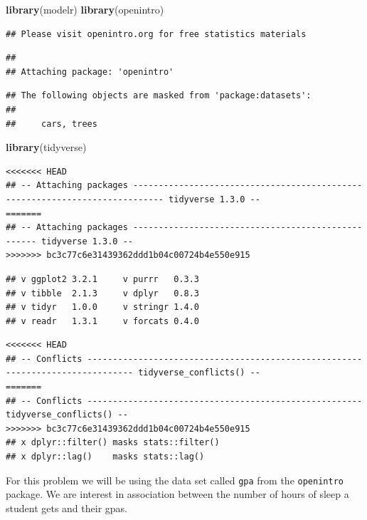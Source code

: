 \documentclass[]{article}
\newenvironment{Shaded}{\begin{snugshade}}{\end{snugshade}}
\newcommand{\KeywordTok}[1]{\textcolor[rgb]{0.13,0.29,0.53}{\textbf{#1}}}
\newcommand{\NormalTok}[1]{#1}
\begin{document}
\begin{Shaded}
\begin{Highlighting}[]
\KeywordTok{library}\NormalTok{(modelr)}
\KeywordTok{library}\NormalTok{(openintro)}
\end{Highlighting}
\end{Shaded}

\begin{verbatim}
## Please visit openintro.org for free statistics materials
\end{verbatim}

\begin{verbatim}
## 
## Attaching package: 'openintro'
\end{verbatim}

\begin{verbatim}
## The following objects are masked from 'package:datasets':
## 
##     cars, trees
\end{verbatim}

\begin{Shaded}
\begin{Highlighting}[]
\KeywordTok{library}\NormalTok{(tidyverse)}
\end{Highlighting}
\end{Shaded}

\begin{verbatim}
<<<<<<< HEAD
## -- Attaching packages ---------------------------------------------------------------------------- tidyverse 1.3.0 --
=======
## -- Attaching packages --------------------------------------------------- tidyverse 1.3.0 --
>>>>>>> bc3c77c6e31439362ddd1b04c00724b4e550e915
\end{verbatim}

\begin{verbatim}
## v ggplot2 3.2.1     v purrr   0.3.3
## v tibble  2.1.3     v dplyr   0.8.3
## v tidyr   1.0.0     v stringr 1.4.0
## v readr   1.3.1     v forcats 0.4.0
\end{verbatim}

\begin{verbatim}
<<<<<<< HEAD
## -- Conflicts ------------------------------------------------------------------------------- tidyverse_conflicts() --
=======
## -- Conflicts ------------------------------------------------------ tidyverse_conflicts() --
>>>>>>> bc3c77c6e31439362ddd1b04c00724b4e550e915
## x dplyr::filter() masks stats::filter()
## x dplyr::lag()    masks stats::lag()
\end{verbatim}

For this problem we will be using the data set called \texttt{gpa} from
the \texttt{openintro} package. We are interest in association between
the number of hours of sleep a student gets and their gpas.
\end{document}

